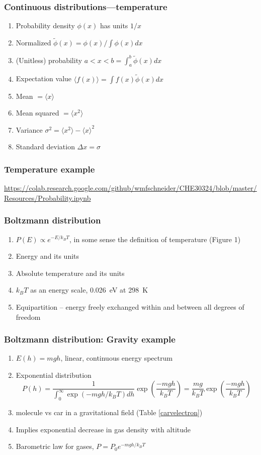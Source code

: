 \documentclass[11pt]{article}
\begin{document}
\subsubsection{Continuous distributions---temperature}
\label{sec:orgc70d8fe}
\begin{enumerate}
\item Probability density \(\phi(x)\) has units \(1/x\)
\item Normalized \(\tilde \phi(x) = \phi(x)/\int \phi(x) dx\)
\item (Unitless) probability \(a < x < b = \int_a^b \tilde \phi(x) dx\)
\item Expectation value \(\langle f(x) \rangle = \int f(x) \tilde \phi(x) dx\)
\item Mean \(= \langle x \rangle\)
\item Mean squared \(= \langle x^2 \rangle\)
\item Variance \(\sigma^2=\langle x^2 \rangle - \langle x \rangle^2\)
\item Standard deviation \(\Delta x = \sigma\)
\end{enumerate}
\subsubsection{Temperature example}
\label{sec:org6e7a8e2}
\url{https://colab.research.google.com/github/wmfschneider/CHE30324/blob/master/Resources/Probability.ipynb}
\subsubsection{Boltzmann distribution}
\label{sec:org0d28c1c}
\begin{enumerate}
\item \(P(E) \propto e^{-E/k_BT}\), in some sense the definition of temperature (Figure 1)
\item Energy and its units
\item Absolute temperature and its units
\item \(k_BT\) as an energy scale, \SI{0.026}{eV} at \SI{298}{K}
\item Equipartition -- energy freely exchanged within and between all degrees of freedom
\end{enumerate}
\subsubsection{Boltzmann distribution: Gravity example}
\label{sec:orgb5ce169}
\begin{enumerate}
\item \(E(h)=mgh\), linear, continuous energy spectrum
\item Exponential distribution
\[P(h) = \frac{1}{\int_0^\infty \exp\left(-mgh/k_BT\right)dh }\exp\left(\frac{-mgh}{k_BT}\right )  =  \frac{mg}{k_BT}\exp\left(\frac{-mgh}{k_BT}\right)\]
\item molecule vs car in a gravitational field (Table \ref{carvelectron})
\item Implies exponential decrease in gas density with altitude
\item Barometric law for gases, \(P=P_0e^{-mgh/k_BT}\)
\end{enumerate}
\end{document}
